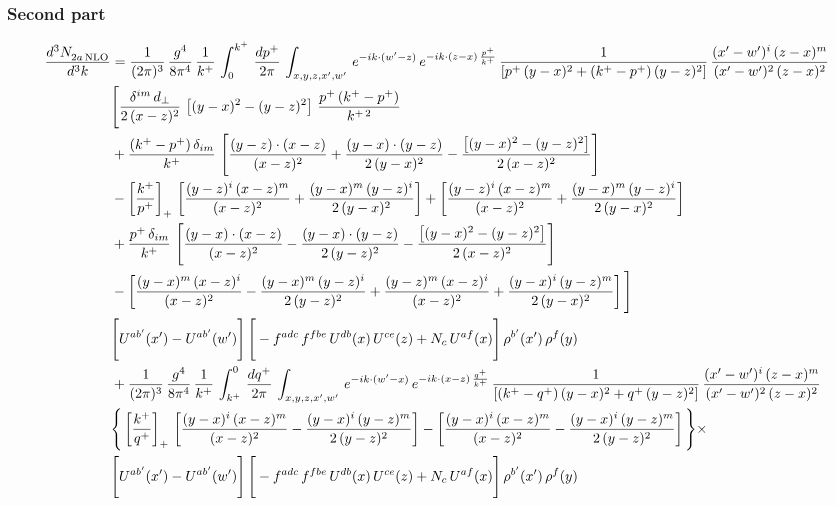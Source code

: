 \documentclass[9pt]{article}
\numberwithin{equation}{section}
\begin{document}
\subsubsection*{Second part}
\begin{align}
    \frac{d^{3}N_{2a\,\rm NLO}^{\rm}}{d^{3}k}  & =  \frac{1}{(2\pi)^{3}}\, \frac{g^{4}}{8\pi^{4}}\,\frac{1}{k^{+}}\,\int_{0}^{k^{+}}\, \frac{dp^{+}}{2\pi}\,\int_{x,y,z,x',w'}\, e^{-ik\cdot(w'-z)}\,e^{-ik\cdot (z-x)\,\frac{p^{+}}{k^{+}}}\,\frac{1}{\left[p^{+}\,(y-x)^{2}+(k^{+}-p^{+})\,(y-z)^{2}\right]}\, \frac{(x'-w')^{i}\,(z-x)^{m}}{(x'-w')^{2}\,(z-x)^{2}} \notag \\ & \Bigg[\frac{\delta^{im}\,d_{\perp}}{2\,(x-z)^{2}}\,\left[(y-x)^{2}-(y-z)^{2}\right]\,\frac{p^{+}\,(k^{+}-p^{+})}{k^{+\,2}}\notag \\ & +\frac{(k^{+}-p^{+})\,\delta_{im}}{k^{+}}\,\left[\frac{(y-z)\cdot (x-z)}{(x-z)^{2}}+\frac{(y-x)\cdot (y-z)}{2\,(y-x)^{2}}-\frac{\left[(y-x)^{2}-(y-z)^{2}\right]}{2\,(x-z)^{2}}\right]\notag \\ & -\left[\frac{k^{+}}{p^{+}}\right]_{+}\,\left[\frac{(y-z)^{i}\,(x-z)^{m}}{(x-z)^{2}}+\frac{(y-x)^{m}\,(y-z)^{i}}{2\,(y-x)^{2}}\right]+ \left[\frac{(y-z)^{i}\,(x-z)^{m}}{(x-z)^{2}}+\frac{(y-x)^{m}\,(y-z)^{i}}{2\,(y-x)^{2}}\right]\notag \\ & +\frac{p^{+}\,\delta_{im}}{k^{+}}\,\left[\frac{(y-x)\cdot (x-z)}{(x-z)^{2}}-\frac{(y-x)\cdot (y-z)}{2\,(y-z)^{2}}-\frac{\left[(y-x)^{2}-(y-z)^{2}\right]}{2\,(x-z)^{2}}\right]\notag \\ &-\left[\frac{(y-x)^{m}\,(x-z)^{i}}{(x-z)^{2}}-\frac{(y-x)^{m}\,(y-z)^{i}}{2\,(y-z)^{2}}+\frac{(y-z)^{m}\,(x-z)^{i}}{(x-z)^{2}}+\frac{(y-x)^{i}\,(y-z)^{m}}{2\,(y-x)^{2}}\right]\Bigg] \notag \\ & \Bigg[U^{ab'}(x')-U^{ab'}(w')\Bigg]\,\Bigg[-f^{adc}\,f^{fbe}\,U^{db}(x)\,U^{ce}(z)+N_{c}\,U^{af}(x)\Bigg]\,\rho^{b'}(x')\,\rho^{f}(y)\notag \\ & + \frac{1}{(2\pi)^{3}}\,\frac{g^{4}}{8\pi^{4}}\,\frac{1}{k^{+}}\, \int^{0}_{k^{+}}\, \frac{dq^{+}}{2\pi} \,  \int_{x,y,z,x',w'}\,e^{-ik\cdot(w'-x)}\,e^{-ik\cdot (x-z)\,\frac{q^{+}}{k^{+}}}\,\frac{1}{\left[(k^{+}-q^{+})\,(y-x)^{2}+q^{+}\,(y-z)^{2}\right]}\, \frac{(x'-w')^{i}\,(z-x)^{m}}{(x'-w')^{2}\,(z-x)^{2}} \notag \\ &\Bigg\{\left[\frac{k^{+}}{q^{+}}\right]_{+}\,\left[\frac{(y-x)^{i}\,(x-z)^{m}}{(x-z)^{2}}-\frac{(y-x)^{i}\,(y-z)^{m}}{2\,(y-z)^{2}}\right] -\left[\frac{(y-x)^{i}\,(x-z)^{m}}{(x-z)^{2}}-\frac{(y-x)^{i}\,(y-z)^{m}}{2\,(y-z)^{2}}\right]\Bigg\}\times\,\notag \\ & \Bigg[U^{ab'}(x')-U^{ab'}(w')\Bigg]\,\Bigg[-f^{adc}\,f^{fbe}\,U^{db}(x)\,U^{ce}(z)+N_{c}\,U^{af}(x)\Bigg]\,\rho^{b'}(x')\,\rho^{f}(y)
\end{align} 
\end{document}
